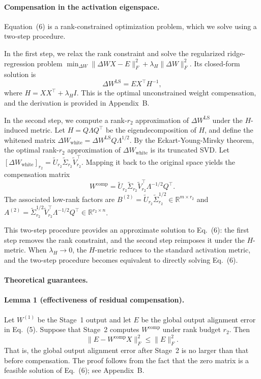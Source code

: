 \documentclass[a4paper,fleqn]{cas-dc}
\begin{document}
\paragraph{Compensation in the activation eigenspace.}
Equation~(6) is a rank-constrained optimization problem, which we solve using a two-step procedure.

In the first step, we relax the rank constraint and solve the regularized ridge-regression problem
$\min_{\Delta W} \|\Delta W X - E\|_F^2 + \lambda_H \|\Delta W\|_F^2$.
Its closed-form solution is
\begin{equation}
\Delta W^{\mathrm{LS}} = EX^\top H^{-1},
\tag{7}
\end{equation}
where $H = XX^\top + \lambda_H I$. This is the optimal unconstrained weight compensation, and the derivation is provided in Appendix~B.

In the second step, we compute a rank-$r_2$ approximation of $\Delta W^{\mathrm{LS}}$ under the $H$-induced metric. Let $H = Q\Lambda Q^\top$ be the eigendecomposition of $H$, and define the whitened matrix $\Delta W_{\mathrm{white}} = \Delta W^{\mathrm{LS}} Q\Lambda^{1/2}$. By the Eckart-Young-Mirsky theorem, the optimal rank-$r_2$ approximation of $\Delta W_{\mathrm{white}}$ is its truncated SVD. Let $[\Delta W_{\mathrm{white}}]_{r_2} = \tilde{U}_{r_2}\tilde{\Sigma}_{r_2}\tilde{V}_{r_2}^\top$. Mapping it back to the original space yields the compensation matrix
\begin{equation}
W^{\mathrm{comp}} = \tilde{U}_{r_2}\tilde{\Sigma}_{r_2}\tilde{V}_{r_2}^\top \Lambda^{-1/2}Q^\top.
\tag{8}
\end{equation}
The associated low-rank factors are $B^{(2)} = \tilde{U}_{r_2}\tilde{\Sigma}_{r_2}^{1/2} \in \mathbb{R}^{m \times r_2}$ and $A^{(2)} = \tilde{\Sigma}_{r_2}^{1/2}\tilde{V}_{r_2}^\top \Lambda^{-1/2}Q^\top \in \mathbb{R}^{r_2 \times n}$.

This two-step procedure provides an approximate solution to Eq.~(6): the first step removes the rank constraint, and the second step reimposes it under the $H$-metric. When $\lambda_H \to 0$, the $H$-metric reduces to the standard activation metric, and the two-step procedure becomes equivalent to directly solving Eq.~(6).

\paragraph{Theoretical guarantees.}

\paragraph{Lemma 1 (effectiveness of residual compensation).}
Let $W^{(1)}$ be the Stage~1 output and let $E$ be the global output alignment error in Eq.~(5). Suppose that Stage~2 computes $W^{\mathrm{comp}}$ under rank budget $r_2$. Then
\begin{equation}
\|E - W^{\mathrm{comp}}X\|_F^2 \le \|E\|_F^2.
\tag{9}
\end{equation}
That is, the global output alignment error after Stage~2 is no larger than that before compensation. The proof follows from the fact that the zero matrix is a feasible solution of Eq.~(6); see Appendix~B.
\end{document}
